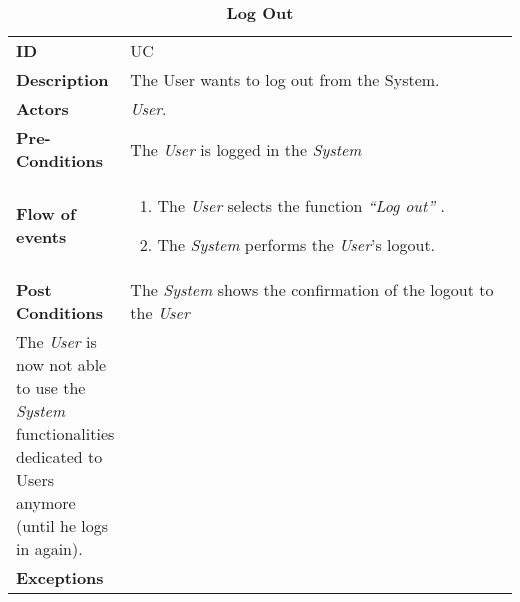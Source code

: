 \begin{longtable}{|p{0.2\linewidth} p{0.8\linewidth}|}
	\captionsetup{labelformat=empty} %
	\caption{\textbf{Log Out}} %
	\label{UC_Logout}%
	\\ \hline %
	
	\textbf{ID} & UC\theUseCaseIdCounter \\ \hline
	\textbf{Description} & The User wants to log out from the System. \\ \hline
	\textbf{Actors} & \emph{User}.\\ \hline
	\textbf{Pre-Conditions} & The \emph{User} is logged in the \emph{System} \\ \hline
	\textbf{Flow of events} & 
	\begin{enumerate}
		\item The \emph{User} selects the function \textit{\textquotedblleft{Log out}\textquotedblright} .
		\item The \emph{System} performs the \emph{User}'s logout.
	\end{enumerate}	 \\ \hline
	\textbf{Post Conditions} & The \emph{System} shows the confirmation of the logout to the \emph{User}\\ \hline
	The \emph{User} is now not able to use the \emph{System} functionalities dedicated to Users anymore (until he logs in again). \\ \hline
	\textbf{Exceptions} & 
	\begin{itemize}
	\end{itemize} \\ \hline
\end{longtable}

